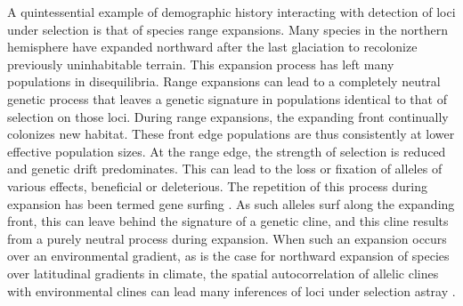 A quintessential example of demographic history interacting with detection of loci under selection is that of species range expansions. Many species in the northern hemisphere have expanded northward after the last glaciation to recolonize previously uninhabitable terrain. This expansion process has left many populations in disequilibria. Range expansions can lead to a completely neutral genetic process that leaves a genetic signature in populations identical to that of selection on those loci. During range expansions, the expanding front continually colonizes new habitat. These front edge populations are thus consistently at lower effective population sizes. At the range edge, the strength of selection is reduced and genetic drift predominates. This can lead to the loss or fixation of alleles of various effects, beneficial or deleterious.  The repetition of this process during expansion has been termed gene surfing \citep{Klopfstein:2006}. As such alleles surf along the expanding front, this can leave behind the signature of a genetic cline, and this cline results from a purely neutral process during expansion. When such an expansion occurs over an environmental gradient, as is the case for northward expansion of species over latitudinal gradients in climate, the spatial autocorrelation of allelic clines with environmental clines can lead many inferences of loci under selection astray \citep{Whitlock:2015}.

